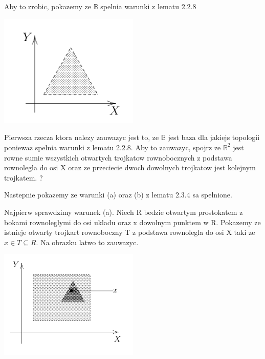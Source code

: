 \documentclass{article}
\begin{document}
Aby to zrobic, pokazemy ze $\mathbb{B}$ spelnia warunki z lematu 2.2.8

\begin{center}
    \begin{minipage}[h]{0.8\textwidth}
        \centering
        \includegraphics[width=0.5\textwidth]{trojkat1.png}
    \end{minipage}
\end{center}

Pierwsza rzecza ktora nalezy zauwazyc jest to, ze $\mathbb{B}$ jest baza dla jakiejs topologii poniewaz spelnia warunki z lematu 2.2.8. Aby to zauwazyc, spojrz ze $\mathbb{R}^{2}$ jest rowne sumie wszystkich otwartych trojkatow rownobocznych z podstawa rownolegla do osi X oraz ze przeciecie dwoch dowolnych trojkatow jest kolejnym trojkatem. ?

Nastepnie pokazemy ze warunki (a) oraz (b) z lematu 2.3.4 sa spelnione.

Najpierw sprawdzimy warunek (a). Niech R bedzie otwartym prostokatem z bokami rownoleglymi do osi ukladu oraz x dowolnym punktem w R. Pokazemy ze istnieje otwarty trojkart rownoboczny T z podstawa rownolegla do osi X taki ze $x \in T \subseteq R$. Na obrazku latwo to zauwazyc.

\begin{center}
    \begin{minipage}[h]{0.8\textwidth}
        \centering
        \includegraphics[width=0.5\textwidth]{trojkat2.png}
    \end{minipage}
\end{center}
\end{document}
